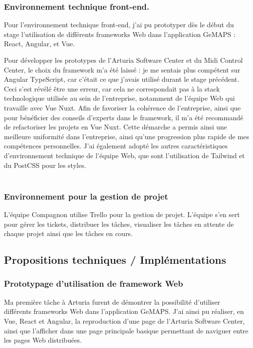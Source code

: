 \documentclass[francais]{rapportPFE}  %
\begin{document}
\subsubsection{Environnement technique front-end.}

Pour l'environnement technique front-end, j'ai pu prototyper dès le début du stage l'utilisation de différents frameworks Web dans l'application GeMAPS : React, Angular, et Vue.  

Pour développer les prototypes de l'Arturia Software Center et du Midi Control Center, le choix du framework m'a été laissé : je me sentais plus compétent sur Angular TypeScript, car c'était ce que j'avais utilisé durant le stage précédent. Ceci s'est révélé être une erreur, car cela ne correspondait pas à la stack technologique utilisée au sein de l'entreprise, notamment de l'équipe Web qui travaille avec Vue Nuxt. Afin de favoriser la cohérence de l'entreprise, ainsi que pour bénéficier des conseils d'experts dans le framework, il m'a été recommandé de refactoriser les projets en Vue Nuxt. Cette démarche a permis ainsi une meilleure uniformité dans l'entreprise, ainsi qu'une progression plus rapide de mes compétences personnelles. J'ai également adopté les autres caractéristiques d'environnement technique de l'équipe Web, que sont l'utilisation de Tailwind et du PostCSS pour les styles. 
\\
\\
\subsubsection{Environnement pour la gestion de projet}
L'équipe Compagnon utilise Trello pour la gestion de projet. L'équipe s'en sert pour gérer les tickets, distribuer les tâches, visualiser les tâches en attente de chaque projet ainsi que les tâches en cours.

\subsection{Propositions techniques / Implémentations}
\subsubsection{Prototypage d'utilisation de framework Web}
Ma première tâche à Arturia furent de démontrer la possibilité d'utiliser différents frameworks Web dans l'application GeMAPS.
J'ai ainsi pu réaliser, en Vue, React et Angular, la reproduction d'une page de l'Arturia Software Center, ainsi que l'afficher dans une page principale basique permettant de naviguer entre les pages Web distribuées. 
\end{document}
